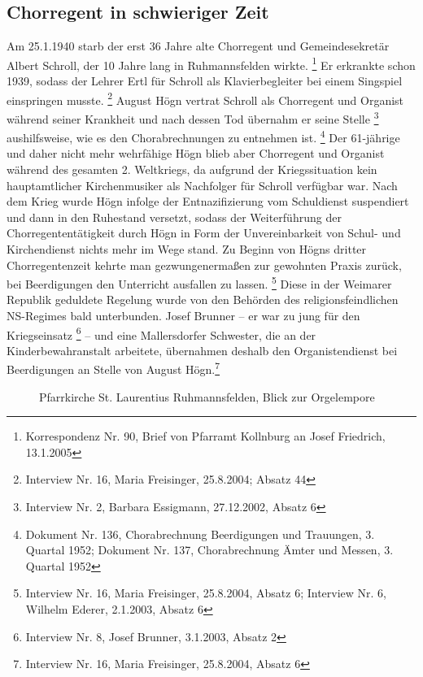 \subsection{Chorregent in schwieriger Zeit}

Am 25.1.1940 starb der erst 36
Jahre alte Chorregent und Gemeindesekretär Albert Schroll, der 10 Jahre
lang in Ruhmannsfelden wirkte. \footnote{Korrespondenz Nr. 90, Brief
von Pfarramt Kollnburg an Josef Friedrich, 13.1.2005} Er erkrankte
schon 1939, sodass der Lehrer Ertl für Schroll als Klavierbegleiter bei
einem Singspiel einspringen musste. \footnote{Interview Nr. 16, Maria
Freisinger, 25.8.2004; Absatz 44} August Högn vertrat Schroll als
Chorregent und Organist während seiner Krankheit und nach dessen Tod
übernahm er seine Stelle \footnote{Interview Nr. 2, Barbara Essigmann,
27.12.2002, Absatz 6} aushilfsweise, wie es den Chorabrechnungen zu
entnehmen ist. \footnote{Dokument Nr. 136, Chorabrechnung Beerdigungen
und Trauungen, 3. Quartal 1952; Dokument Nr. 137, Chorabrechnung Ämter
und Messen, 3. Quartal 1952} Der 61-jährige und daher nicht mehr
wehrfähige Högn blieb aber Chorregent und Organist während des gesamten
2. Weltkriegs, da aufgrund der Kriegssituation kein hauptamtlicher
Kirchenmusiker als Nachfolger für Schroll verfügbar war. Nach dem Krieg
wurde Högn infolge der Entnazifizierung vom Schuldienst suspendiert und
dann in den Ruhestand versetzt, sodass der Weiterführung der
Chorregententätigkeit durch Högn in Form der Unvereinbarkeit von Schul-
und Kirchendienst nichts mehr im Wege stand. Zu Beginn von Högns
dritter Chorregentenzeit kehrte man gezwungenermaßen zur gewohnten
Praxis zurück, bei Beerdigungen den Unterricht ausfallen zu
lassen. \footnote{Interview Nr. 16, Maria Freisinger, 25.8.2004, Absatz
6; Interview Nr. 6, Wilhelm Ederer, 2.1.2003, Absatz 6} Diese in der
Weimarer Republik geduldete Regelung wurde von den Behörden des
religionsfeindlichen NS-Regimes bald unterbunden. Josef Brunner – er
war zu jung für den Kriegseinsatz \footnote{Interview Nr. 8, Josef
Brunner, 3.1.2003, Absatz 2} – und eine Mallersdorfer Schwester, die an
der Kinderbewahranstalt arbeitete, übernahmen deshalb den
Organistendienst bei Beerdigungen an Stelle von August Högn.\footnote{
Interview Nr. 16, Maria Freisinger, 25.8.2004, Absatz 6}

\begin{figure}
\caption{Pfarrkirche St. Laurentius Ruhmannsfelden, Blick zur Orgelempore}
\end{figure}


